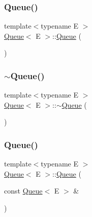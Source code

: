 \mbox{\label{class_queue_ab09891e54b51dc677ee6efb350687ae4}} 
\subsubsection{\texorpdfstring{Queue()}{Queue()}\hspace{0.1cm}{\footnotesize\ttfamily [5/6]}}
{\footnotesize\ttfamily template$<$typename E $>$ \\
\mbox{\hyperlink{class_queue}{Queue}}$<$ E $>$\+::\mbox{\hyperlink{class_queue}{Queue}} (\begin{DoxyParamCaption}{ }\end{DoxyParamCaption})\hspace{0.3cm}{\ttfamily [inline]}}

\mbox{\label{class_queue_a49fe82adb8dc2fb62ab53876a6933d0f}} 
\subsubsection{\texorpdfstring{$\sim$Queue()}{~Queue()}\hspace{0.1cm}{\footnotesize\ttfamily [3/3]}}
{\footnotesize\ttfamily template$<$typename E $>$ \\
\mbox{\hyperlink{class_queue}{Queue}}$<$ E $>$\+::$\sim$\mbox{\hyperlink{class_queue}{Queue}} (\begin{DoxyParamCaption}{ }\end{DoxyParamCaption})\hspace{0.3cm}{\ttfamily [inline]}}

\mbox{\label{class_queue_ac071ee553005a67737d35edeeaafca5b}} 
\subsubsection{\texorpdfstring{Queue()}{Queue()}\hspace{0.1cm}{\footnotesize\ttfamily [6/6]}}
{\footnotesize\ttfamily template$<$typename E $>$ \\
\mbox{\hyperlink{class_queue}{Queue}}$<$ E $>$\+::\mbox{\hyperlink{class_queue}{Queue}} (\begin{DoxyParamCaption}\item[{const \mbox{\hyperlink{class_queue}{Queue}}$<$ E $>$ \&}]{ }\end{DoxyParamCaption})\hspace{0.3cm}{\ttfamily [private]}}



